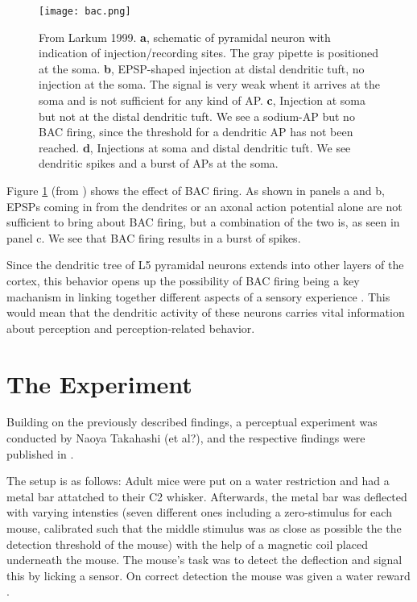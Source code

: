 \documentclass[
10pt, %
a4paper, %
oneside, %
headinclude,footinclude, %
BCOR5mm, %
]{scrartcl}
\begin{document}
\begin{figure}[tb]
\centering 
\texttt{[image: bac.png]} 
\caption[BAC Firing]{From Larkum 1999. \textbf{a}, schematic of pyramidal neuron with indication of injection/recording sites. The gray pipette is positioned at the soma. \textbf{b}, EPSP-shaped injection at distal dendritic tuft, no injection at the soma. The signal is very weak whent it arrives at the soma and is not sufficient for any kind of AP. \textbf{c}, Injection at soma but not at the distal dendritic tuft. We see a sodium-AP but no BAC firing, since the threshold for a dendritic AP has not been reached. \textbf{d},  Injections at soma and distal dendritic tuft. We see dendritic spikes and a burst of APs at the soma.} %
\label{fig:bac} 
\end{figure}

Figure \ref{fig:bac} (from \cite{Larkum1999}) shows the effect of BAC firing. As shown in panels a and b, EPSPs coming in from the dendrites or an axonal action potential alone are not sufficient to bring about BAC firing, but a combination of the two is, as seen in panel c. We see that BAC firing results in a burst of spikes.

Since the dendritic tree of L5 pyramidal neurons extends into other layers of the cortex, this behavior opens up the possibility of BAC firing being a key machanism in linking together different aspects of a sensory experience \cite{Larkum1999}. This would mean that the dendritic activity of these neurons carries vital information about perception and perception-related behavior.


\section{The Experiment}
Building on the previously described findings, a perceptual experiment was conducted by Naoya Takahashi (et al?), and the respective findings were published in \cite{Takahashi2016}.

The setup is as follows: Adult mice were put on a water restriction and had a metal bar attatched to their C2 whisker. Afterwards, the metal bar was deflected with varying intensties (seven different ones including a zero-stimulus for each mouse, calibrated such that the middle stimulus was as close as possible the the detection threshold of the mouse) with the help of a magnetic coil placed underneath the mouse. The mouse's task was to detect the deflection and signal this by licking a sensor. On correct detection the mouse was given a water reward \cite{Takahashi2016}.
\end{document}

